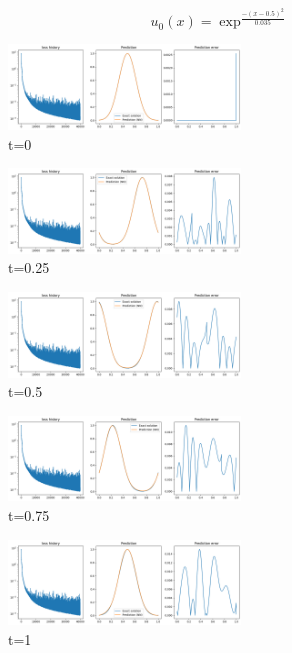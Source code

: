 \documentclass{article}
\begin{document}
\begin{equation*}
    u_0(x) = \exp^{\frac{-(x-0.5)^2}{0.035}}
\end{equation*}

\begin{figure}[!h]
    \centering
    \includegraphics[width=0.55\textwidth]{images/r1.png}
    \caption{t=0}
\end{figure}
\begin{figure}[!h]
    \centering
    \includegraphics[width=0.55\textwidth]{images/r2.png}
    \caption{t=0.25}
\end{figure}
\begin{figure}[!h]
    \centering
    \includegraphics[width=0.55\textwidth]{images/r3.png}
    \caption{t=0.5}
\end{figure}

\begin{figure}[!h]
    \centering
    \includegraphics[width=0.55\textwidth]{images/r4.png}
    \caption{t=0.75}
\end{figure}

\begin{figure}[!h]
    \centering
    \includegraphics[width=0.55\textwidth]{images/r5.png}
    \caption{t=1}
\end{figure} 
\end{document}
